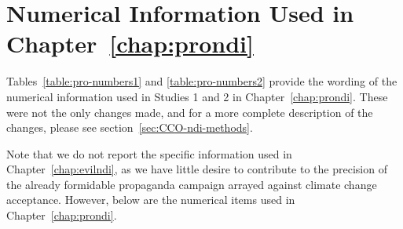 \chapter{Numerical Information Used in Chapter~\ref{chap:prondi}}
\label{app:numbers}

Tables~\ref{table:pro-numbers1} and \ref{table:pro-numbers2} provide the wording
of the numerical information used in Studies 1 and 2 in
Chapter~\ref{chap:prondi}. These were not the only changes made, and for a more
complete description of the changes, please see
section~\ref{sec:CCO-ndi-methods}.

Note that we do not report the specific information used in
Chapter~\ref{chap:evilndi}, as we have little desire to contribute to the
precision of the already formidable propaganda campaign arrayed against climate
change acceptance.  However, below are the numerical items used in
Chapter~\ref{chap:prondi}.

